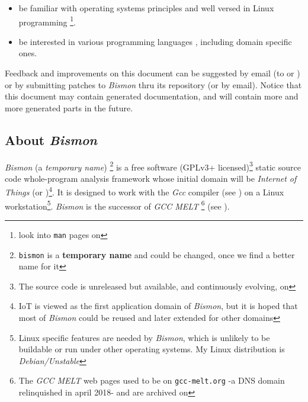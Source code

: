 \begin{itemize}
\item be familiar with operating systems principles
  \cite{Tanenbaum:92:OS,ArpaciDusseau14-Book,OSTEP-web} and well
  versed in Linux programming
  \cite{Mitchell:2001:ALP,Kerrisk:2010:LinuxProgramming} \footnote{look
    into \texttt{man} pages on
    }.

  \item be interested in various programming languages
    \cite{Abelson1996:SICP,Scott:2007:PLP,Queinnec:1996:LSP},
    including domain specific ones.

\end{itemize}

Feedback and improvements on this document can be suggested by email
(to  or
) or by submitting patches to
\textit{Bismon} thru its  repository
(or by email). Notice that this document may contain generated
documentation, and will contain more and more generated parts in the
future.

\subsection{About \textit{Bismon}}

\textit{Bismon} (a \emph{temporary name}) \footnote{\texttt{bismon} is a \textbf{temporary name}
  and could be changed, once we find a better name for it} is a free
software (GPLv3+ licensed)\footnote{The source code is unreleased but available, and continuously evolving, on } static source code whole-program analysis framework whose
initial domain will be \emph{Internet of Things} (or
)\footnote{IoT is viewed as the first application
  domain of \textit{Bismon}, but it is hoped that most of
  \textit{Bismon} could be reused and later extended for other
  domains}. It is designed to work with the \textit{Gcc} compiler (see
) on a Linux workstation\footnote{Linux specific features are needed by \textit{Bismon}, which is unlikely to be buildable or run under other operating systems. My Linux distribution is \emph{Debian/Unstable}}. \textit{Bismon} is the
successor of \textit{GCC MELT} \footnote{The \textit{GCC MELT} web
  pages used to be on \texttt{gcc-melt.org} -a DNS domain relinquished
  in april 2018- and are archived on
  } (see \cite{Starynkevitch2007Multistage, starynkevitch-DSL2011}).

